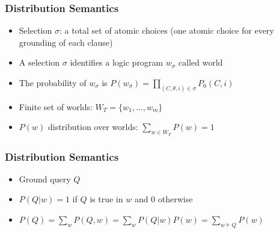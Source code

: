 \documentclass[trans]{beamer}
\newcommand{\myalert}[1]{{%
 #1}}
\begin{document}
\begin{frame}
  \frametitle{Distribution Semantics}
\begin{itemize}
\item \myalert{Selection} $\sigma$: a total set of atomic choices (one atomic choice
for every grounding of each clause)
\item A selection $\sigma$ identifies a  logic program $w_\sigma$ called  \myalert{world}
\item The probability of $w_\sigma$ is $P(w_\sigma)=\prod_{(C,\theta,i)\in \sigma}P_0(C,i)$
\item Finite set of worlds: $W_T=\{w_1,\ldots,w_m\}$
\item $P(w)$ distribution over worlds:  $\sum_{w\in W_T}P(w)=1$
\end{itemize}
\end{frame}
\begin{frame}
  \frametitle{Distribution Semantics}
\begin{itemize}
\item Ground query $Q$
\item $P(Q|w)=1$ if $Q$ is true in $w$ and 0 otherwise
\item $P(Q)=\sum_{w}P(Q,w)=\sum_{w}P(Q|w)P(w)=\sum_{w\models Q}P(w)$
\end{itemize}
\end{frame}
\end{document}
